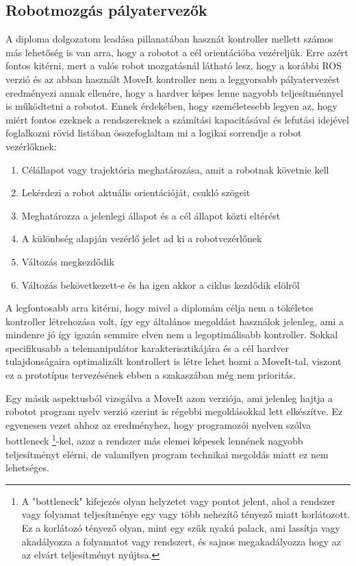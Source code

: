 \subsection{Robotmozgás pályatervezők}

A diploma dolgozatom leadása pillanatában hasznát kontroller mellett számos más lehetőség is van arra, hogy a robotot a cél orientációba vezéreljük. Erre azért fontos kitérni, mert a valós robot mozgatásnál látható lesz, hogy a korábbi ROS verzió és az abban használt MoveIt kontroller nem a leggyorsabb pályatervezést eredményezi annak ellenére, hogy a hardver képes lenne nagyobb teljesítménnyel is működtetni a robotot. Ennek érdekében, hogy személetesebb legyen az, hogy miért fontos ezeknek a rendszereknek a számítási kapacitásával és lefutási idejével foglalkozni rövid listában összefoglaltam mi a logikai sorrendje a robot vezérlőknek:

\begin{enumerate}
\item Célállapot vagy trajektória meghatározása, amit a robotnak követnie kell
\item Lekérdezi a robot aktuális orientációját, csukló szögeit
\item Meghatározza a jelenlegi állapot és a cél állapot közti eltérést
\item A különbség alapján vezérlő jelet ad ki a robotvezérlőnek
\item Változás megkezdődik
\item Változás bekövetkezett-e és ha igen akkor a ciklus kezdődik elölről
\end{enumerate}

A legfontosabb arra kitérni, hogy mivel a diplomám célja nem a tökéletes kontroller létrehozása volt, így egy általános megoldást használok jelenleg, ami a mindenre jó így igazán semmire elven nem a legoptimálisabb kontroller. Sokkal specifikusabb a telemanipulátor karakterisztikájára és a cél hardver tulajdonságaira optimalizált kontrollert is létre lehet hozni a MoveIt-tal, viszont ez a prototípus tervezésének ebben a szakaszában még nem prioritás.

Egy másik aspektusból vizsgálva a MoveIt azon verziója, ami jelenleg hajtja a robotot program nyelv verzió szerint is régebbi megoldásokkal lett elkészítve. Ez egyenesen vezet ahhoz az eredményhez, hogy programozói nyelven szólva bottleneck \footnote{A "bottleneck" kifejezés olyan helyzetet vagy pontot jelent, ahol a rendszer vagy folyamat teljesítménye egy vagy több nehezítő tényező miatt korlátozott. Ez a korlátozó tényező olyan, mint egy szűk nyakú palack, ami lassítja vagy akadályozza a folyamatot vagy rendszert, és sajnos megakadályozza hogy az az elvárt teljesítményt nyújtsa.}-kel, azaz a rendszer más elemei képesek lennének nagyobb teljesítményt elérni, de valamilyen program technikai megoldás miatt ez nem lehetséges.

